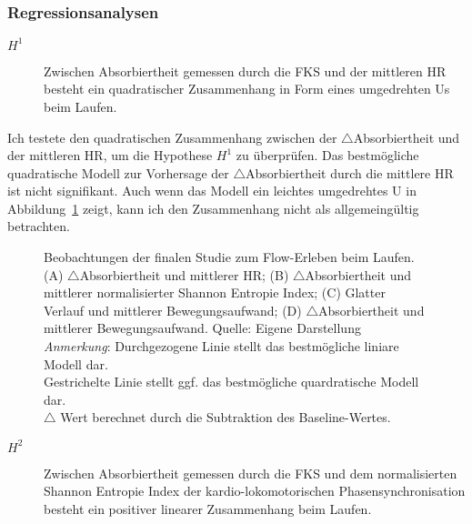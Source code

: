 \subsubsection{Regressionsanalysen}
\label{ssub:regressionsanalysen}

\begin{description}
	\item[$H^1$] Zwischen Absorbiertheit gemessen durch die \ac{FKS} und der mittleren \ac{HR} besteht ein quadratischer Zusammenhang in Form eines umgedrehten Us beim Laufen.
\end{description}

Ich testete den quadratischen Zusammenhang zwischen der $\bigtriangleup$Absorbiertheit und der mittleren \ac{HR}, um die Hypothese $H^1$ zu überprüfen. Das bestmögliche quadratische Modell zur Vorhersage der $\bigtriangleup$Absorbiertheit durch die mittlere \ac{HR} ist nicht signifikant. Auch wenn das Modell ein leichtes umgedrehtes U in Abbildung~\ref{fig:5_18_regression} zeigt, kann ich den Zusammenhang nicht als allgemeingültig betrachten.

\begin{figure}
	
	\caption[Beobachtungen der finalen Studie zum Flow-Erleben beim Laufen]{Beobachtungen der finalen Studie zum Flow-Erleben beim Laufen. (A) $\bigtriangleup$Absorbiertheit und mittlerer HR; (B) $\bigtriangleup$Absorbiertheit und mittlerer normalisierter Shannon Entropie Index; (C) Glatter Verlauf und mittlerer Bewegungsaufwand; (D) $\bigtriangleup$Absorbiertheit und mittlerer Bewegungsaufwand. Quelle: Eigene Darstellung \\ \hspace{\textwidth}\emph{Anmerkung}: Durchgezogene Linie stellt das bestmögliche liniare Modell dar. \\ \hspace{\textwidth}Gestrichelte Linie stellt ggf. das bestmögliche quardratische Modell dar. \\ \hspace{\textwidth}$\bigtriangleup$ Wert berechnet durch die Subtraktion des Baseline-Wertes.}
	\label{fig:5_18_regression}
\end{figure}

\begin{description}
	\item[$H^2$] Zwischen Absorbiertheit gemessen durch die \ac{FKS} und dem normalisierten Shannon Entropie Index der kardio-lokomotorischen Phasensynchronisation besteht ein positiver linearer Zusammenhang beim Laufen.
\end{description}

